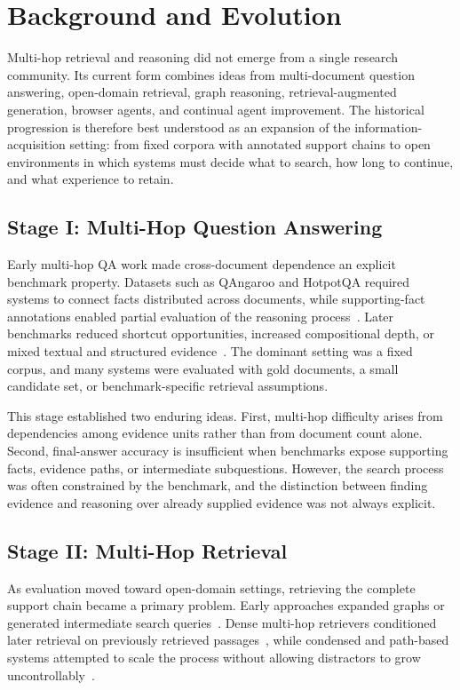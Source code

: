 \section{Background and Evolution}
\label{sec:background}

Multi-hop retrieval and reasoning did not emerge from a single research community. Its current form combines ideas from multi-document question answering, open-domain retrieval, graph reasoning, retrieval-augmented generation, browser agents, and continual agent improvement. The historical progression is therefore best understood as an expansion of the information-acquisition setting: from fixed corpora with annotated support chains to open environments in which systems must decide what to search, how long to continue, and what experience to retain.

\subsection{Stage I: Multi-Hop Question Answering}

Early multi-hop QA work made cross-document dependence an explicit benchmark property. Datasets such as QAngaroo and HotpotQA required systems to connect facts distributed across documents, while supporting-fact annotations enabled partial evaluation of the reasoning process~\cite{welbl2018qangaroo,yang2018hotpotqa}. Later benchmarks reduced shortcut opportunities, increased compositional depth, or mixed textual and structured evidence~\cite{trivedi2020nohotpot,trivedi2022musique,chen2020hybridqa,talmor2021multimodalqa}. The dominant setting was a fixed corpus, and many systems were evaluated with gold documents, a small candidate set, or benchmark-specific retrieval assumptions.

This stage established two enduring ideas. First, multi-hop difficulty arises from dependencies among evidence units rather than from document count alone. Second, final-answer accuracy is insufficient when benchmarks expose supporting facts, evidence paths, or intermediate subquestions. However, the search process was often constrained by the benchmark, and the distinction between finding evidence and reasoning over already supplied evidence was not always explicit.

\subsection{Stage II: Multi-Hop Retrieval}

As evaluation moved toward open-domain settings, retrieving the complete support chain became a primary problem. Early approaches expanded graphs or generated intermediate search queries~\cite{sun2019pullnet,min2019golden}. Dense multi-hop retrievers conditioned later retrieval on previously retrieved passages~\cite{xiong2021mdr,zhao2021beamdr}, while condensed and path-based systems attempted to scale the process without allowing distractors to grow uncontrollably~\cite{asai2020learning,khattab2021baleen}.

